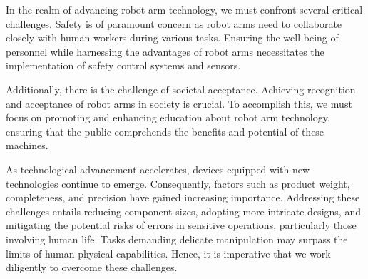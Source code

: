 In the realm of advancing robot arm technology, we must confront several critical challenges. Safety is of paramount concern as robot arms need to collaborate closely with human workers during various tasks. Ensuring the well-being of personnel while harnessing the advantages of robot arms necessitates the implementation of safety control systems and sensors.

Additionally, there is the challenge of societal acceptance. Achieving recognition and acceptance of robot arms in society is crucial. To accomplish this, we must focus on promoting and enhancing education about robot arm technology, ensuring that the public comprehends the benefits and potential of these machines.

As technological advancement accelerates, devices equipped with new technologies continue to emerge. Consequently, factors such as product weight, completeness, and precision have gained increasing importance. Addressing these challenges entails reducing component sizes, adopting more intricate designs, and mitigating the potential risks of errors in sensitive operations, particularly those involving human life. Tasks demanding delicate manipulation may surpass the limits of human physical capabilities. Hence, it is imperative that we work diligently to overcome these challenges.